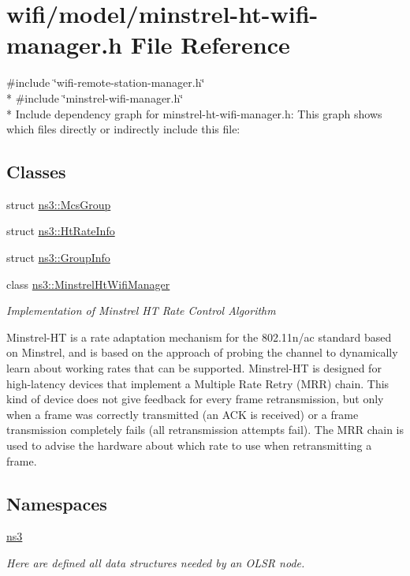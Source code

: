 \hypertarget{minstrel-ht-wifi-manager_8h}{}\section{wifi/model/minstrel-\/ht-\/wifi-\/manager.h File Reference}
\label{minstrel-ht-wifi-manager_8h}
{\ttfamily \#include \char`\"{}wifi-\/remote-\/station-\/manager.\+h\char`\"{}}\\*
{\ttfamily \#include \char`\"{}minstrel-\/wifi-\/manager.\+h\char`\"{}}\\*
Include dependency graph for minstrel-\/ht-\/wifi-\/manager.h\+:
This graph shows which files directly or indirectly include this file\+:
\subsection*{Classes}
\begin{DoxyCompactItemize}
\item 
struct \hyperlink{structns3_1_1McsGroup}{ns3\+::\+Mcs\+Group}
\item 
struct \hyperlink{structns3_1_1HtRateInfo}{ns3\+::\+Ht\+Rate\+Info}
\item 
struct \hyperlink{structns3_1_1GroupInfo}{ns3\+::\+Group\+Info}
\item 
class \hyperlink{classns3_1_1MinstrelHtWifiManager}{ns3\+::\+Minstrel\+Ht\+Wifi\+Manager}
\begin{DoxyCompactList}\small\item\em Implementation of Minstrel HT Rate Control Algorithm

Minstrel-\/\+HT is a rate adaptation mechanism for the 802.\+11n/ac standard based on Minstrel, and is based on the approach of probing the channel to dynamically learn about working rates that can be supported. Minstrel-\/\+HT is designed for high-\/latency devices that implement a Multiple Rate Retry (M\+RR) chain. This kind of device does not give feedback for every frame retransmission, but only when a frame was correctly transmitted (an A\+CK is received) or a frame transmission completely fails (all retransmission attempts fail). The M\+RR chain is used to advise the hardware about which rate to use when retransmitting a frame. \end{DoxyCompactList}\end{DoxyCompactItemize}
\subsection*{Namespaces}
\begin{DoxyCompactItemize}
\item 
 \hyperlink{namespacens3}{ns3}
\begin{DoxyCompactList}\small\item\em Here are defined all data structures needed by an O\+L\+SR node. \end{DoxyCompactList}\end{DoxyCompactItemize}
